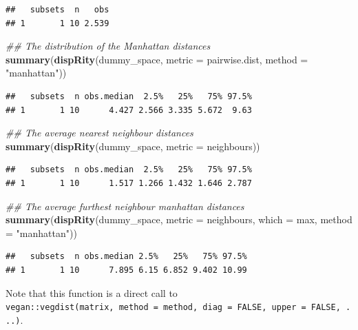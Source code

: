 \documentclass[]{book}
\newenvironment{Shaded}{\begin{snugshade}}{\end{snugshade}}
\newcommand{\CommentTok}[1]{\textcolor[rgb]{0.56,0.35,0.01}{\textit{#1}}}
\newcommand{\DataTypeTok}[1]{\textcolor[rgb]{0.13,0.29,0.53}{#1}}
\newcommand{\KeywordTok}[1]{\textcolor[rgb]{0.13,0.29,0.53}{\textbf{#1}}}
\newcommand{\NormalTok}[1]{#1}
\newcommand{\StringTok}[1]{\textcolor[rgb]{0.31,0.60,0.02}{#1}}
\begin{document}
\begin{verbatim}
##   subsets  n   obs
## 1       1 10 2.539
\end{verbatim}

\begin{Shaded}
\begin{Highlighting}[]
\CommentTok{## The distribution of the Manhattan distances}
\KeywordTok{summary}\NormalTok{(}\KeywordTok{dispRity}\NormalTok{(dummy_space, }\DataTypeTok{metric =}\NormalTok{ pairwise.dist,}
                 \DataTypeTok{method =} \StringTok{"manhattan"}\NormalTok{))}
\end{Highlighting}
\end{Shaded}

\begin{verbatim}
##   subsets  n obs.median  2.5%   25%   75% 97.5%
## 1       1 10      4.427 2.566 3.335 5.672  9.63
\end{verbatim}

\begin{Shaded}
\begin{Highlighting}[]
\CommentTok{## The average nearest neighbour distances}
\KeywordTok{summary}\NormalTok{(}\KeywordTok{dispRity}\NormalTok{(dummy_space, }\DataTypeTok{metric =}\NormalTok{ neighbours))}
\end{Highlighting}
\end{Shaded}

\begin{verbatim}
##   subsets  n obs.median  2.5%   25%   75% 97.5%
## 1       1 10      1.517 1.266 1.432 1.646 2.787
\end{verbatim}

\begin{Shaded}
\begin{Highlighting}[]
\CommentTok{## The average furthest neighbour manhattan distances}
\KeywordTok{summary}\NormalTok{(}\KeywordTok{dispRity}\NormalTok{(dummy_space, }\DataTypeTok{metric =}\NormalTok{ neighbours,}
                 \DataTypeTok{which =}\NormalTok{ max, }\DataTypeTok{method =} \StringTok{"manhattan"}\NormalTok{))}
\end{Highlighting}
\end{Shaded}

\begin{verbatim}
##   subsets  n obs.median 2.5%   25%   75% 97.5%
## 1       1 10      7.895 6.15 6.852 9.402 10.99
\end{verbatim}

Note that this function is a direct call to \texttt{vegan::vegdist(matrix,\ method\ =\ method,\ diag\ =\ FALSE,\ upper\ =\ FALSE,\ ...)}.
\end{document}
